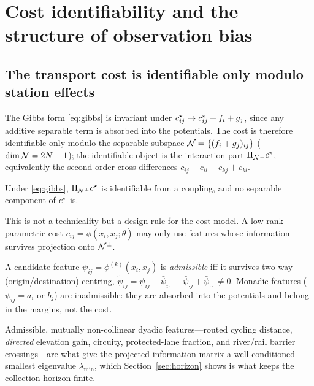 \section{Cost identifiability and the structure of observation bias}
\label{sec:theory}

\subsection{The transport cost is identifiable only modulo station effects}
\label{sec:identif}

The Gibbs form \eqref{eq:gibbs} is invariant under
$c^{\star}_{ij}\mapsto c^{\star}_{ij}+f_i+g_j$, since any additive separable term is
absorbed into the potentials. The cost is therefore identifiable only modulo the
separable subspace $\mathcal{N}=\{(f_i+g_j)_{ij}\}$ ($\dim\mathcal{N}=2N-1$); the
identifiable object is the interaction part $\Pi_{\mathcal{N}^\perp} c^{\star}$, equivalently the
second-order cross-differences $c_{ij}-c_{il}-c_{kj}+c_{kl}$.

\begin{theorem}
\label{thm:identif}
Under \eqref{eq:gibbs}, $\Pi_{\mathcal{N}^\perp}c^{\star}$ is identifiable from a coupling, and no
separable component of $c^{\star}$ is. 
\end{theorem}

This is not a technicality but a design rule for the cost model. A low-rank
parametric cost $c_{ij}=\phi(x_i,x_j;\theta)$ may only use features whose
information survives projection onto $\mathcal{N}^\perp$.

\begin{definition}
\label{def:admissible}
A candidate feature $\psi_{ij}=\phi^{(k)}(x_i,x_j)$ is \emph{admissible} iff it
survives two-way (origin/destination) centring,
$\tilde\psi_{ij}=\psi_{ij}-\bar\psi_{i\cdot}-\bar\psi_{\cdot j}+\bar\psi_{\cdot\cdot}
\neq 0$. Monadic features ($\psi_{ij}=a_i$ or $b_j$) are inadmissible: they are
absorbed into the potentials and belong in the margins, not the cost.
\end{definition}

Admissible, mutually non-collinear dyadic features---routed cycling distance,
\emph{directed} elevation gain, circuity, protected-lane fraction, and
river/rail barrier crossings---are what give the projected information matrix a
well-conditioned smallest eigenvalue $\lambda_{\min}$, which
Section~\ref{sec:horizon} shows is what keeps the collection horizon finite.

